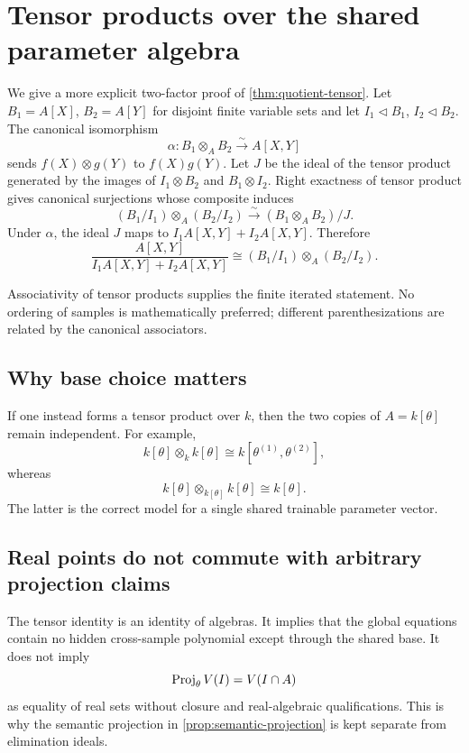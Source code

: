 \section{Tensor products over the shared parameter algebra}
\label{app:tensor}

We give a more explicit two-factor proof of \cref{thm:quotient-tensor}.  Let
\(B_1=A[X]\), \(B_2=A[Y]\) for disjoint finite variable sets and let
\(I_1\lhd B_1\), \(I_2\lhd B_2\).  The canonical isomorphism
\begin{equation}
  \alpha:B_1\otimes_A B_2\xrightarrow{\sim}A[X,Y]
\end{equation}
sends \(f(X)\otimes g(Y)\) to \(f(X)g(Y)\).  Let \(J\) be the ideal of the
tensor product generated by the images of \(I_1\otimes B_2\) and
\(B_1\otimes I_2\).  Right exactness of tensor product gives canonical
surjections whose composite induces
\begin{equation}
 (B_1/I_1)\otimes_A(B_2/I_2)
 \xrightarrow{\sim}(B_1\otimes_AB_2)/J.
\end{equation}
Under \(\alpha\), the ideal \(J\) maps to
\(I_1A[X,Y]+I_2A[X,Y]\).  Therefore
\begin{equation}
 \frac{A[X,Y]}{I_1A[X,Y]+I_2A[X,Y]}
 \cong (B_1/I_1)\otimes_A(B_2/I_2).
\end{equation}

Associativity of tensor products supplies the finite iterated statement.  No
ordering of samples is mathematically preferred; different parenthesizations
are related by the canonical associators.

\subsection{Why base choice matters}

If one instead forms a tensor product over \(k\), then the two copies of
\(A=k[\theta]\) remain independent.  For example,
\begin{equation}
  k[\theta]\otimes_k k[\theta]
  \cong k[\theta^{(1)},\theta^{(2)}],
\end{equation}
whereas
\begin{equation}
  k[\theta]\otimes_{k[\theta]}k[\theta]
  \cong k[\theta].
\end{equation}
The latter is the correct model for a single shared trainable parameter vector.

\subsection{Real points do not commute with arbitrary projection claims}

The tensor identity is an identity of algebras.  It implies that the global
equations contain no hidden cross-sample polynomial except through the shared
base.  It does not imply
\begin{equation}
  \operatorname{Proj}_\theta V(I)=V(I\cap A)
\end{equation}
as equality of real sets without closure and real-algebraic qualifications.
This is why the semantic projection in \cref{prop:semantic-projection} is kept
separate from elimination ideals.
